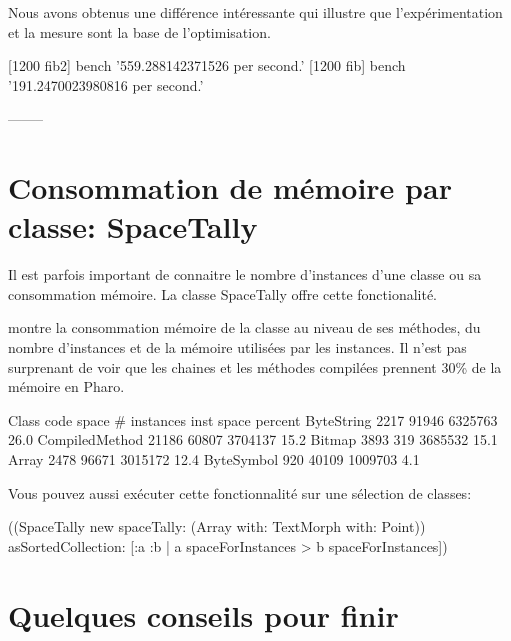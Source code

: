\documentclass[a4paper,10pt,twoside]{book}
\begin{document}
Nous avons obtenus une diff\'erence int\'eressante qui illustre 
que
l'exp\'erimentation et la mesure sont la base de l'optimisation. 

\begin{code}{}
[1200 fib2] bench  '559.288142371526 per second.'
[1200 fib] bench  '191.2470023980816 per second.'
\end{code}



--------
\section{Consommation de m\'emoire par classe: SpaceTally}

Il est parfois important de connaitre le nombre d'instances d'une
classe ou sa consommation m\'emoire. La classe SpaceTally offre cette
fonctionalit\'e. 

 montre la consommation
m\'emoire de la classe au niveau de ses m\'ethodes, du nombre
d'instances et de la m\'emoire utilis\'ees par les instances. Il n'est pas
surprenant de voir que les chaines et les m\'ethodes compil\'ees
prennent 30\% de la m\'emoire en Pharo.

\begin{code}{}
Class                           code space # instances  inst space percent
ByteString                           2217       91946       6325763    26.0
CompiledMethod               21186       60807       3704137    15.2
Bitmap                                  3893         319       3685532    15.1
Array                                     2478       96671       3015172    12.4
ByteSymbol                        920       40109       1009703     4.1
\end{code}

Vous pouvez aussi ex\'ecuter cette fonctionnalit\'e sur une s\'election de classes: 
\begin{code}{}
((SpaceTally new spaceTally: (Array with: TextMorph with: Point)) 
	asSortedCollection: [:a :b | a spaceForInstances > b spaceForInstances]) 
\end{code}



\section{Quelques conseils pour finir}
\end{document}
